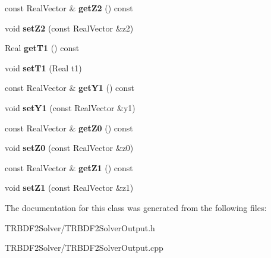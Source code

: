 \begin{DoxyCompactItemize}
\item 
\hypertarget{classTRBDF2SolverOutput_aa0ed760c1abf0c0d84a301c7ca207533}{
const RealVector \& {\bfseries getZ2} () const }
\label{classTRBDF2SolverOutput_aa0ed760c1abf0c0d84a301c7ca207533}

\item 
\hypertarget{classTRBDF2SolverOutput_a6b5c18bc78394e18372723a87f4bb134}{
void {\bfseries setZ2} (const RealVector \&z2)}
\label{classTRBDF2SolverOutput_a6b5c18bc78394e18372723a87f4bb134}

\item 
\hypertarget{classTRBDF2SolverOutput_af17ecb422f1b60fa63c7acbb2249bb1c}{
Real {\bfseries getT1} () const }
\label{classTRBDF2SolverOutput_af17ecb422f1b60fa63c7acbb2249bb1c}

\item 
\hypertarget{classTRBDF2SolverOutput_a58cee4a42fe8c8363a4cc442b236edbf}{
void {\bfseries setT1} (Real t1)}
\label{classTRBDF2SolverOutput_a58cee4a42fe8c8363a4cc442b236edbf}

\item 
\hypertarget{classTRBDF2SolverOutput_a9a9241061b20569c65d90599a9bbaaaf}{
const RealVector \& {\bfseries getY1} () const }
\label{classTRBDF2SolverOutput_a9a9241061b20569c65d90599a9bbaaaf}

\item 
\hypertarget{classTRBDF2SolverOutput_a1c72f8f41f4be088a9ee59aa04a3487a}{
void {\bfseries setY1} (const RealVector \&y1)}
\label{classTRBDF2SolverOutput_a1c72f8f41f4be088a9ee59aa04a3487a}

\item 
\hypertarget{classTRBDF2SolverOutput_a7c0a761d421ed91c77ae9353c21efd44}{
const RealVector \& {\bfseries getZ0} () const }
\label{classTRBDF2SolverOutput_a7c0a761d421ed91c77ae9353c21efd44}

\item 
\hypertarget{classTRBDF2SolverOutput_a0d60332dafe04aeb309c6d3f4b19d6f2}{
void {\bfseries setZ0} (const RealVector \&z0)}
\label{classTRBDF2SolverOutput_a0d60332dafe04aeb309c6d3f4b19d6f2}

\item 
\hypertarget{classTRBDF2SolverOutput_a25eddadb39872f554829aa4d766a150e}{
const RealVector \& {\bfseries getZ1} () const }
\label{classTRBDF2SolverOutput_a25eddadb39872f554829aa4d766a150e}

\item 
\hypertarget{classTRBDF2SolverOutput_a9297774be02296f8df5fa3cd51026405}{
void {\bfseries setZ1} (const RealVector \&z1)}
\label{classTRBDF2SolverOutput_a9297774be02296f8df5fa3cd51026405}

\end{DoxyCompactItemize}


The documentation for this class was generated from the following files:\begin{DoxyCompactItemize}
\item 
TRBDF2Solver/TRBDF2SolverOutput.h\item 
TRBDF2Solver/TRBDF2SolverOutput.cpp\end{DoxyCompactItemize}
